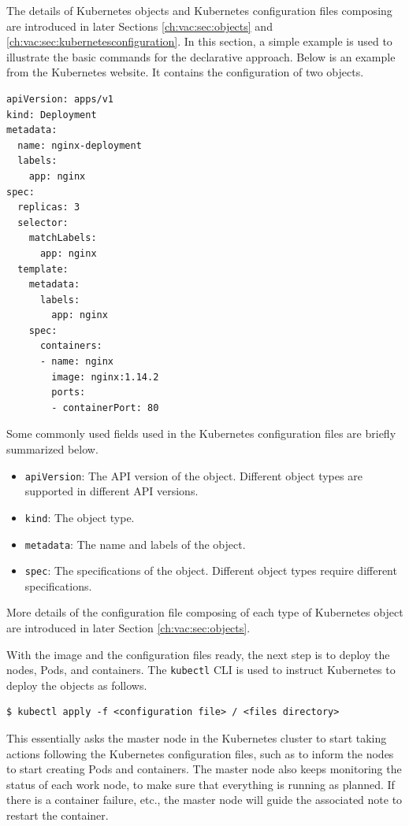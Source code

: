 The details of Kubernetes objects and Kubernetes configuration files composing are introduced in later Sections \ref{ch:vac:sec:objects} and \ref{ch:vac:sec:kubernetesconfiguration}. In this section, a simple example is used to illustrate the basic commands for the declarative approach. Below is an example from the Kubernetes website. It contains the configuration of two objects.
\begin{lstlisting}
apiVersion: apps/v1
kind: Deployment
metadata:
  name: nginx-deployment
  labels:
    app: nginx
spec:
  replicas: 3
  selector:
    matchLabels:
      app: nginx
  template:
    metadata:
      labels:
        app: nginx
    spec:
      containers:
      - name: nginx
        image: nginx:1.14.2
        ports:
        - containerPort: 80
\end{lstlisting}

Some commonly used fields used in the Kubernetes configuration files are briefly summarized below.
\begin{itemize}
	\item \verb|apiVersion|: The API version of the object. Different object types are supported in different API versions.
	\item \verb|kind|: The object type.
	\item \verb|metadata|: The name and labels of the object. 
	\item \verb|spec|: The specifications of the object. Different object types require different specifications.
\end{itemize}
More details of the configuration file composing of each type of Kubernetes object are introduced in later Section \ref{ch:vac:sec:objects}. 

With the image and the configuration files ready, the next step is to deploy the nodes, Pods, and containers. The \verb|kubectl| CLI is used to instruct Kubernetes to deploy the objects as follows.
\begin{lstlisting}
$ kubectl apply -f <configuration file> / <files directory>
\end{lstlisting}
This essentially asks the master node in the Kubernetes cluster to start taking actions following the Kubernetes configuration files, such as to inform the nodes to start creating Pods and containers. The master node also keeps monitoring the status of each work node, to make sure that everything is running as planned. If there is a container failure, etc., the master node will guide the associated note to restart the container.

